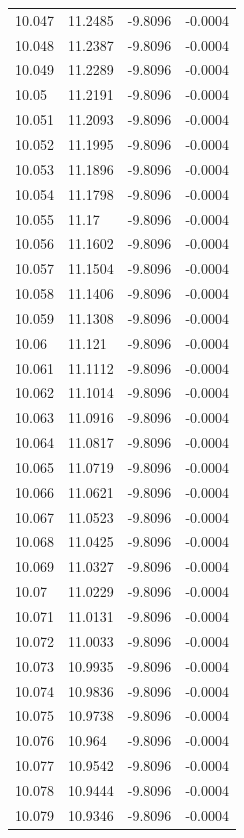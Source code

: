 \begin{tabular}{llll}
10.047 & 11.2485 & -9.8096 & -0.0004 \\
10.048 & 11.2387 & -9.8096 & -0.0004 \\
10.049 & 11.2289 & -9.8096 & -0.0004 \\
10.05 & 11.2191 & -9.8096 & -0.0004 \\
10.051 & 11.2093 & -9.8096 & -0.0004 \\
10.052 & 11.1995 & -9.8096 & -0.0004 \\
10.053 & 11.1896 & -9.8096 & -0.0004 \\
10.054 & 11.1798 & -9.8096 & -0.0004 \\
10.055 & 11.17 & -9.8096 & -0.0004 \\
10.056 & 11.1602 & -9.8096 & -0.0004 \\
10.057 & 11.1504 & -9.8096 & -0.0004 \\
10.058 & 11.1406 & -9.8096 & -0.0004 \\
10.059 & 11.1308 & -9.8096 & -0.0004 \\
10.06 & 11.121 & -9.8096 & -0.0004 \\
10.061 & 11.1112 & -9.8096 & -0.0004 \\
10.062 & 11.1014 & -9.8096 & -0.0004 \\
10.063 & 11.0916 & -9.8096 & -0.0004 \\
10.064 & 11.0817 & -9.8096 & -0.0004 \\
10.065 & 11.0719 & -9.8096 & -0.0004 \\
10.066 & 11.0621 & -9.8096 & -0.0004 \\
10.067 & 11.0523 & -9.8096 & -0.0004 \\
10.068 & 11.0425 & -9.8096 & -0.0004 \\
10.069 & 11.0327 & -9.8096 & -0.0004 \\
10.07 & 11.0229 & -9.8096 & -0.0004 \\
10.071 & 11.0131 & -9.8096 & -0.0004 \\
10.072 & 11.0033 & -9.8096 & -0.0004 \\
10.073 & 10.9935 & -9.8096 & -0.0004 \\
10.074 & 10.9836 & -9.8096 & -0.0004 \\
10.075 & 10.9738 & -9.8096 & -0.0004 \\
10.076 & 10.964 & -9.8096 & -0.0004 \\
10.077 & 10.9542 & -9.8096 & -0.0004 \\
10.078 & 10.9444 & -9.8096 & -0.0004 \\
10.079 & 10.9346 & -9.8096 & -0.0004 \\

\end{tabular}
